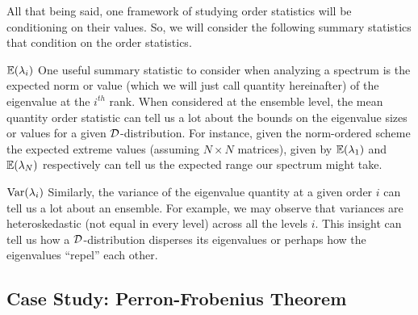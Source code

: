 

All that being said, one framework of studying order statistics will be conditioning on their values. So, we will consider the following summary statistics that condition on the order statistics. \newline


 $\mathbb{E}(\lambda_{i})$ One useful summary statistic to consider when analyzing a spectrum is the expected norm or value (which we will just call quantity hereinafter) of the eigenvalue at the $i^{th}$ rank.
When considered at the ensemble level, the mean quantity order statistic can tell us a lot about the bounds on the eigenvalue sizes or values for a given $\mathcal{D}$-distribution.
For instance, given the norm-ordered scheme the expected extreme values (assuming $N \times N$ matrices), given by $\mathbb{E}(\lambda_1)$ and $\mathbb{E}(\lambda_N)$ respectively can tell us the expected range our spectrum might take. \newline

\medskip

 $\text{Var}(\lambda_{i})$ Similarly, the variance of the eigenvalue quantity at a given order $i$ can tell us a lot about an ensemble. For example, we may observe that variances are heteroskedastic (not equal in every level) across all the levels $i$. This insight can tell us how a $\mathcal{D}$-distribution disperses its eigenvalues or perhaps how the eigenvalues ``repel'' each other.

\medskip


\newpage
\subsection{Case Study: Perron-Frobenius Theorem}

